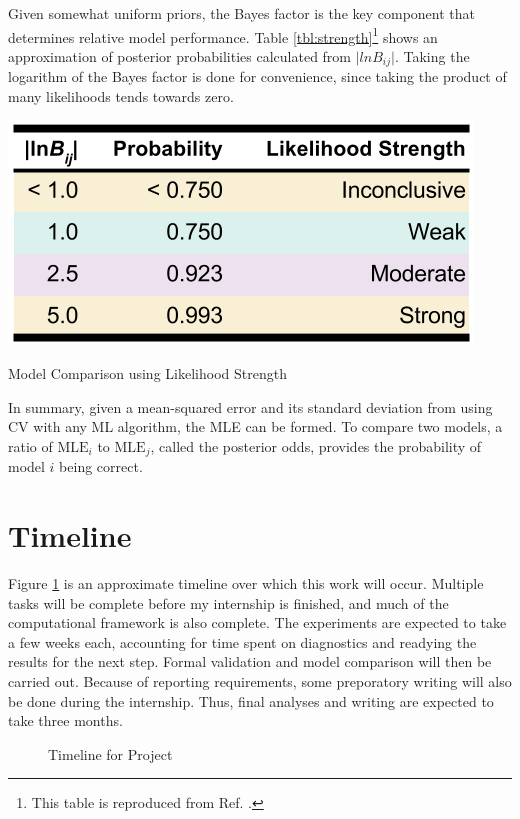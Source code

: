 Given somewhat uniform priors, the Bayes factor is the key component that
determines relative model performance. Table \ref{tbl:strength}\footnote{This
table is reproduced from Ref. \cite{bayes_compare}.} shows an approximation of
posterior probabilities calculated from $\lvert lnB_{ij} \rvert$. Taking the
logarithm of the Bayes factor is done for convenience, since taking the product
of many likelihoods tends towards zero.

\begin{table}[!hbt]
  \centering
  \includegraphics[width=0.7\linewidth]{./chapters/proposal/evidence-strength.png}
  \caption{Model Comparison using Likelihood Strength}
  \label{tbl:strength}
\end{table}

In summary, given a mean-squared error and its standard deviation from using
\gls{CV} with any \gls{ML} algorithm, the \gls{MLE} can be formed. To
compare two models, a ratio of $\text{MLE}_i$ to $\text{MLE}_j$, called the
posterior odds, provides the probability of model $i$ being correct.

\section{Timeline}
\label{sec:timeline}

Figure \ref{fig:time} is an approximate timeline over which this work will
occur.  Multiple tasks will be complete before my internship is finished, and
much of the computational framework is also complete. The experiments are
expected to take a few weeks each, accounting for time spent on diagnostics and
readying the results for the next step. Formal validation and model comparison
will then be carried out. Because of reporting requirements, some preporatory
writing will also be done during the internship. Thus, final analyses and
writing are expected to take three months. 

\begin{figure}[!htb]
  \caption{Timeline for Project}
  \label{fig:time}
\end{figure}

